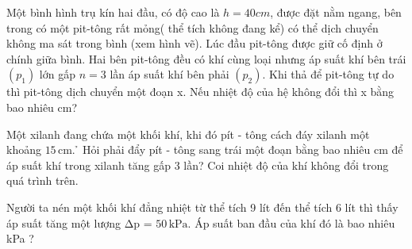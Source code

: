 \begin{ex}
Một bình hình trụ kín hai đầu, có độ cao là $h=40cm$, được đặt nằm ngang, bên trong có một pit-tông rất mỏng( thể tích không đang kể) có thể dịch chuyển không ma sát trong bình (xem hình vẽ). Lúc đầu pit-tông được giữ cố định ở chính giữa bình. Hai bên pit-tông đều có khí cùng loại nhưng áp suất khí bên trái $\left( {{p}_{1}} \right)$ lớn gấp $n=3$ lần áp suất khí bên phải $\left( {{p}_{2}} \right)$. Khi thả để pit-tông tự do thì pit-tông dịch chuyển một đoạn x. Nếu nhiệt độ của hệ không đổi thì x bằng bao nhiêu cm?
\end{ex}

\begin{ex}
Một xilanh đang chứa một khối khí, khi đó pít - tông cách đáy xilanh một khoảng $15\,\text{cm}$. ̉ Hỏi phải đẩy pít - tông sang trái một đoạn bằng bao nhiêu cm để áp suất khí trong xilanh tăng gấp 3 lần? Coi nhiệt độ của khí không đổi trong quá trình trên.
\end{ex}

\begin{ex}
Người ta nén một khối khí đẳng nhiệt từ thể tích 9 lít đến thể tích 6 lít thì thấy áp suất tăng một lượng Δp = $50\,\text{kPa}$. Áp suất ban đầu của khí đó là bao nhiêu kPa ?
\end{ex}

